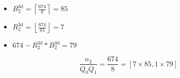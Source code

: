 \begin{itemize}
 \item $B_2^{\textrm{3d}} = \left\lceil \frac{674}{8} \right\rceil = 85$
 \item $R_2^{\textrm{3d}} = \left\lfloor \frac{674}{85} \right\rfloor = 7$
 \item $674 - R_2^{\textrm{3d}}*B_2^{\textrm{3d}} = 79$
\end{itemize}
\begin{equation*}
  \frac{n_2}{Q_0Q_1} = \frac{674}{8} = \left[7\times 85, 1\times 79 \right]
\end{equation*}
